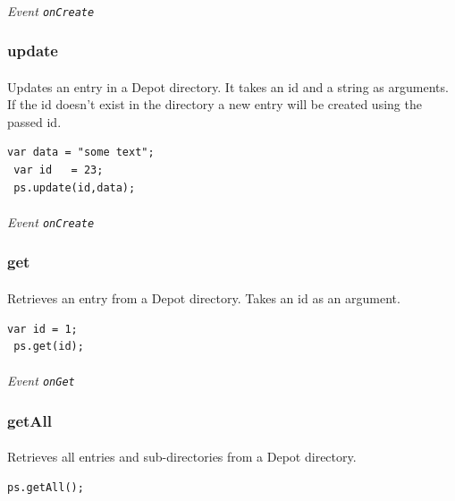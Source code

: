 \documentclass{report}
\begin{document}
\paragraph{}
\textit{Event \texttt{onCreate}}


\subsubsection{update}
\paragraph{}
Updates an entry in a Depot directory. It takes an id and a string as
arguments. If the id doesn't exist in the directory a new entry will
be created using the passed id.

\begin{Verbatim}[frame=single]
 var data = "some text";
 var id   = 23;
 ps.update(id,data);
\end{Verbatim}

\paragraph{}
\textit{Event \texttt{onCreate}}


\subsubsection{get}
\paragraph{}
Retrieves an entry from a Depot directory. Takes an id as an argument.
\begin{Verbatim}[frame=single]
 var id = 1;
 ps.get(id);
\end{Verbatim}

\paragraph{}
\textit{Event \texttt{onGet}}

\subsubsection{getAll}
\paragraph{}
Retrieves all entries and sub-directories from a Depot directory.
\begin{Verbatim}[frame=single]
 ps.getAll();
\end{Verbatim}
\end{document}
